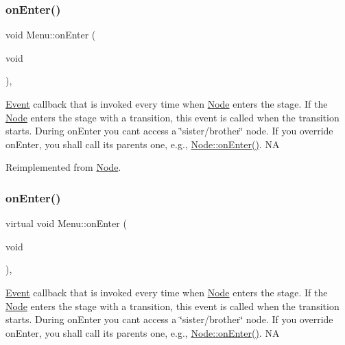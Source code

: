 \mbox{\label{classMenu_ab8c3b9d5d26f512be8f26e5e2f5bda1e}} 
\subsubsection{\texorpdfstring{on\+Enter()}{onEnter()}\hspace{0.1cm}{\footnotesize\ttfamily [1/2]}}
{\footnotesize\ttfamily void Menu\+::on\+Enter (\begin{DoxyParamCaption}\item[{void}]{ }\end{DoxyParamCaption})\hspace{0.3cm}{\ttfamily [override]}, {\ttfamily [virtual]}}

\hyperlink{classEvent}{Event} callback that is invoked every time when \hyperlink{classNode}{Node} enters the \textquotesingle{}stage\textquotesingle{}. If the \hyperlink{classNode}{Node} enters the \textquotesingle{}stage\textquotesingle{} with a transition, this event is called when the transition starts. During on\+Enter you can\textquotesingle{}t access a \char`\"{}sister/brother\char`\"{} node. If you override on\+Enter, you shall call its parent\textquotesingle{}s one, e.\+g., \hyperlink{classNode_a7f51764c4afd5018a052b9ef71c03374}{Node\+::on\+Enter()}.  NA 

Reimplemented from \hyperlink{classNode_a7f51764c4afd5018a052b9ef71c03374}{Node}.

\mbox{\label{classMenu_ac0b9006b091056c9e8c139eb653cc773}} 
\subsubsection{\texorpdfstring{on\+Enter()}{onEnter()}\hspace{0.1cm}{\footnotesize\ttfamily [2/2]}}
{\footnotesize\ttfamily virtual void Menu\+::on\+Enter (\begin{DoxyParamCaption}\item[{void}]{ }\end{DoxyParamCaption})\hspace{0.3cm}{\ttfamily [override]}, {\ttfamily [virtual]}}

\hyperlink{classEvent}{Event} callback that is invoked every time when \hyperlink{classNode}{Node} enters the \textquotesingle{}stage\textquotesingle{}. If the \hyperlink{classNode}{Node} enters the \textquotesingle{}stage\textquotesingle{} with a transition, this event is called when the transition starts. During on\+Enter you can\textquotesingle{}t access a \char`\"{}sister/brother\char`\"{} node. If you override on\+Enter, you shall call its parent\textquotesingle{}s one, e.\+g., \hyperlink{classNode_a7f51764c4afd5018a052b9ef71c03374}{Node\+::on\+Enter()}.  NA 

